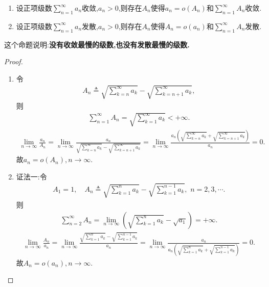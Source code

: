 \documentclass[../../main.tex]{subfiles}%
\begin{document}
\begin{proposition}\label{proposition:没有收敛最慢的级数也没有发散最慢的级数}
\begin{enumerate}[(1)]
\item 设正项级数$\sum\limits_{n=1}^\infty a_n$收敛,$a_n>0$,则存在$A_n$使得$a_n=o(A_n)$和$\sum\limits_{n=1}^\infty A_n$收敛.

\item 设正项级数$\sum\limits_{n=1}^\infty a_n$发散,$a_n>0$,则存在$A_n$使得$A_n=o(a_n)$和$\sum\limits_{n=1}^\infty A_n$发散.
\end{enumerate}
\end{proposition}
\begin{remark}
这个命题说明:\textbf{没有收敛最慢的级数,也没有发散最慢的级数.}
\end{remark}
\begin{proof}
\begin{enumerate}[(1)]
\item 令
\begin{align*}
A_n\triangleq \sqrt{\sum_{k=n}^{\infty}{a_k}}-\sqrt{\sum_{k=n+1}^{\infty}{a_k}},
\end{align*}
则
\begin{align*}
\sum_{n=1}^{\infty}{A_n}=\sqrt{\sum_{k=1}^{\infty}{a_k}}<+\infty .
\end{align*}
\begin{align*}
\lim_{n\rightarrow \infty}\frac{a_n}{A_n}=\lim_{n\rightarrow \infty}\frac{a_n}{\sqrt{\sum\limits_{k=n}^{\infty}{a_k}}-\sqrt{\sum\limits_{k=n+1}^{\infty}{a_k}}}=\lim_{n\rightarrow \infty}\frac{a_n\left( \sqrt{\sum\limits_{k=n}^{\infty}{a_k}}+\sqrt{\sum\limits_{k=n+1}^{\infty}{a_k}} \right)}{a_n}=0.
\end{align*}
故$a_n=o\left( A_n \right) ,n\rightarrow \infty .$

\item {\color{blue}证法一:}令
\begin{align*}
A_1=1,\quad A_n\triangleq \sqrt{\sum_{k=1}^n{a_k}}-\sqrt{\sum_{k=1}^{n-1}{a_k}},\,\,n=2,3,\cdots .
\end{align*}
则
\begin{align*}
\sum_{n=2}^{\infty}{A_n}=\lim_{n\rightarrow \infty}\left( \sqrt{\sum_{k=1}^n{a_k}}-\sqrt{a_1} \right) =+\infty .
\end{align*}
\begin{align*}
\lim_{n\rightarrow \infty}\frac{A_n}{a_n}=\lim_{n\rightarrow \infty}\frac{\sqrt{\sum\limits_{k=1}^n{a_k}}-\sqrt{\sum\limits_{k=1}^{n-1}{a_k}}}{a_n}=\lim_{n\rightarrow \infty}\frac{a_n}{a_n\left( \sqrt{\sum\limits_{k=1}^n{a_k}}+\sqrt{\sum\limits_{k=1}^{n-1}{a_k}} \right)}=0.
\end{align*}
故$A_n=o\left( a_n \right) ,n\rightarrow \infty .$


\end{enumerate}
\end{proof}
\end{document}
